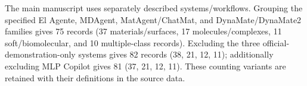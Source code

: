 The main manuscript uses separately described systems/workflows. Grouping the specified El Agente, MDAgent, MatAgent/ChatMat, and DynaMate/DynaMate2 families gives 75 records (37 materials/surfaces, 17 molecules/complexes, 11 soft/biomolecular, and 10 multiple-class records). Excluding the three official-demonstration-only systems gives 82 records (38, 21, 12, 11); additionally excluding MLP Copilot gives 81 (37, 21, 12, 11). These counting variants are retained with their definitions in the source data.


